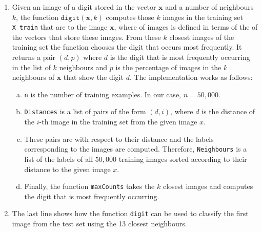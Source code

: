\begin{enumerate}
\item Given an image of a digit stored in the vector $\mathbf{x}$ and a number of neighbours $k$, the function
      $\texttt{digit}(\mathbf{x}, k)$ computes those $k$ images in the training set \texttt{X\_train} that are
       to the image $\mathbf{x}$, where  of images is defined in terms of the
       of the vectors that store these images.  From these $k$ closest images of the training
      set the function chooses the digit that occurs most frequently.  It returns a pair $(d, p)$ where $d$
      is the digit that is most frequently occurring in the list of $k$ neighbours and $p$ is the percentage
      of images in the $k$ neighbours of $\mathbf{x}$ that show the digit $d$.  The implementation works as follows:
      \begin{enumerate}[(a)]
      \item \texttt{n} is the number of training examples.  In our case, $n = 50,000$.
      \item \texttt{Distances} is a list of pairs of the form $(d, i)$, where $d$ is the distance
            of the $i$-th image in the training set from the given image $x$.
      \item These pairs are  with respect to their distance and the labels corresponding to the
            images are computed.  Therefore, \texttt{Neighbours} is a list of the labels of all $50,000$
            training images sorted according to their distance to the given image $x$.
      \item Finally, the function \texttt{maxCounts} takes the $k$ closest images and computes the digit that
            is most frequently occurring.
      \end{enumerate}
\item The last line shows how the function \texttt{digit} can be used to classify the first image from the test
      set using the 13 closest neighbours. 
\end{enumerate}
\pagebreak

